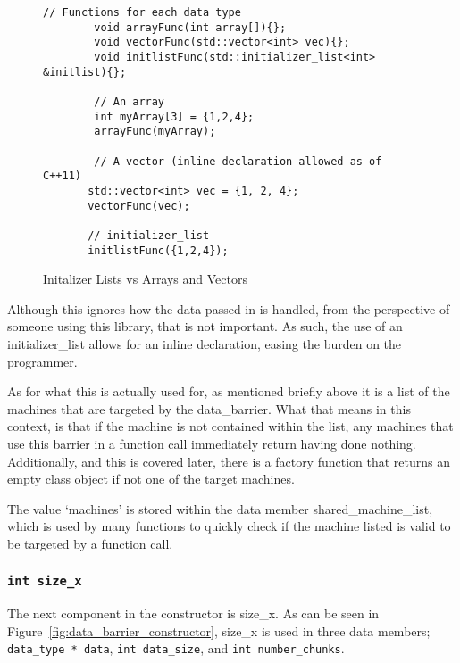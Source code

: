 \documentclass[thesis.tex]{subfiles}
\begin{document}
     \begin{figure}[htbp]
      \centering

      \lstset{language=cpp}  
      \begin{lstlisting}[tabsize=2]
        // Functions for each data type
        void arrayFunc(int array[]){};
        void vectorFunc(std::vector<int> vec){};
        void initlistFunc(std::initializer_list<int> &initlist){};

        // An array
        int myArray[3] = {1,2,4};
        arrayFunc(myArray);

        // A vector (inline declaration allowed as of C++11)
       std::vector<int> vec = {1, 2, 4};
       vectorFunc(vec);

       // initializer_list
       initlistFunc({1,2,4});
        \end{lstlisting}

      \caption{Initalizer Lists vs Arrays and Vectors}
      \label{fig:init_list_vs_others}
    \end{figure}

    Although this ignores how the data passed in is handled, from the perspective of someone using this library, that is not important. As such, the use of an initializer\_list allows for an inline declaration, easing the burden on the programmer.

    As for what this is actually used for, as mentioned briefly above it is a list of the machines that are targeted by the data\_barrier. What that means in this context, is that if the machine is not contained within the list, any machines that use this barrier in a function call immediately return having done nothing. Additionally, and this is covered later, there is a factory function that returns an empty class object if not one of the target machines.

    The value `machines' is stored within the data member shared\_machine\_list, which is used by many functions to quickly check if the machine listed is valid to be targeted by a function call.

  \subsubsection{\texttt{int size\_x}} %
  \label{ssub:int_size_x}
      The next component in the constructor is size\_x. As can be seen in Figure~\ref{fig:data_barrier_constructor}, size\_x is used in three data members; \texttt{data\_type * data}, \texttt{int data\_size}, and \texttt{int number\_chunks}.
\end{document}
